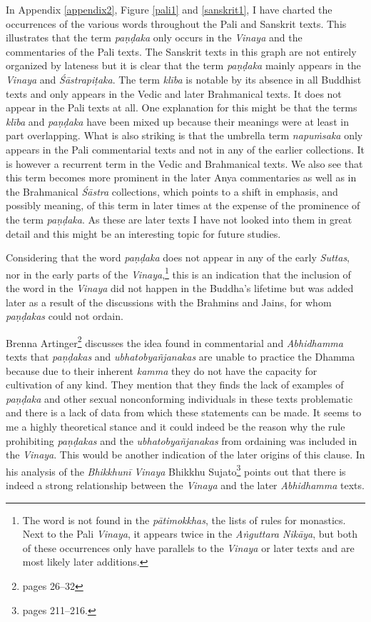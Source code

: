 In Appendix \ref{appendix2}, Figure \ref{pali1} and \ref{sanskrit1}, I have charted the occurrences of the various words throughout the Pali and Sanskrit texts. This illustrates that the term {\em paṇḍaka} only occurs in the {\em Vinaya} and the commentaries of the Pali texts. The Sanskrit texts in this graph are not entirely organized by lateness but it is clear that the term {\em paṇḍaka} mainly appears in the {\em Vinaya} and {\em Śāstrapiṭaka}. The term {\em klība} is notable by its absence in all Buddhist texts and only appears in the Vedic and later Brahmanical texts. It does not appear in the Pali texts at all. One explanation for this might be that the terms {\em klība} and {\em paṇḍaka} have been mixed up because their meanings were at least in part overlapping. What is also striking is that the umbrella term {\em napuṁsaka} only appears in the Pali commentarial texts and not in any of the earlier collections. It is however a recurrent term in the Vedic and Brahmanical texts. We also see that this term becomes more prominent in the later Anya commentaries as well as in the Brahmanical {\em Śāstra} collections, which points to a shift in emphasis, and possibly meaning, of this term in later times at the expense of the prominence of the term {\em paṇḍaka}. As these are later texts I have not looked into them in great detail and this might be an interesting topic for future studies.

Considering that the word {\em paṇḍaka} does not appear in any of the early {\em Suttas}, nor in the early parts of the {\em Vinaya},\footnote{The word is not found in the {\em pātimokkhas}, the lists of rules for monastics. Next to the Pali {\em Vinaya}, it appears twice in the {\em Aṅguttara Nikāya}, but both of these occurrences only have parallels to the {\em Vinaya} or later texts and are most likely later additions.} this is an indication that the inclusion of the word in the {\em Vinaya} did not happen in the Buddha's lifetime but was added later as a result of the discussions with the Brahmins and Jains, for whom {\em paṇḍakas} could not ordain.

Brenna Artinger\footnote{\cite{artinger} pages 26–32} discusses the idea found in commentarial and {\em Abhidhamma} texts that {\em paṇḍakas} and {\em ubhatob­yañ­janakas} are unable to practice the Dhamma because due to their inherent {\em kamma} they do not have the capacity for cultivation of any kind. They mention that they finds the lack of examples of {\em paṇḍaka} and other sexual nonconforming individuals in these texts problematic and there is a lack of data from which these statements can be made. It seems to me a highly theoretical stance and it could indeed be the reason why the rule prohibiting {\em paṇḍakas} and the {\em ubhatob­yañ­janakas} from ordaining was included in the {\em Vinaya}. This would be another indication of the later origins of this clause. In his analysis of the {\em Bhikkhunī} {\em Vinaya} Bhikkhu Sujato\footnote{\cite{sujato2009} pages 211–216.} points out that there is indeed a strong relationship between the {\em Vinaya} and the later {\em Abhidhamma} texts.

